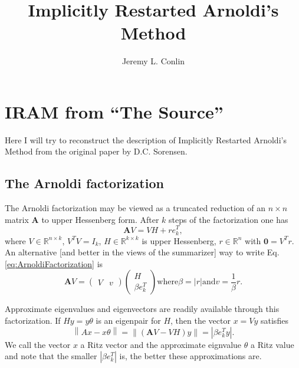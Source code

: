 \documentclass[12pt]{article}
\title{Implicitly Restarted Arnoldi's Method}
\author{Jeremy L. Conlin}
\newcommand{\A}{\mathbf{A}}
\begin{document}
\maketitle
\section{IRAM from ``The Source''}
Here I will try to reconstruct the description of Implicitly Restarted Arnoldi's Method from the original paper by D.C. Sorensen.

\subsection{The Arnoldi factorization}
The Arnoldi factorization may be viewed as a truncated reduction of an $n \times n$ matrix $\A$ to upper Hessenberg form.  After $k$ steps of the factorization one has
\begin{equation}
    \A V = VH + re_k^T,
    \label{eq:ArnoldiFactorization}
\end{equation}
where $V \in \mathbb{R}^{n \times k}$, $V^TV = I_k$, $H \in \mathbb{R}^{k \times k}$ is upper Hessenberg, $r \in \mathbb{R}^n$ with $\mathbf{0} = V^Tr$.  An alternative [and better in the views of the summarizer] way to write Eq. \ref{eq:ArnoldiFactorization} is
\begin{equation}
    \A V = \begin{pmatrix}V & v\end{pmatrix}\begin{pmatrix} H \\ \beta e_k^T \end{pmatrix} \mathrm{ where } \beta = \left| r \right| \mathrm{ and } v = \frac{1}{\beta}r.
    \label{}
\end{equation}

Approximate eigenvalues and eigenvectors are readily available through this factorization.  If $Hy = y\theta$ is an eigenpair for $H$, then the vector $x = Vy$ satisfies
\begin{equation}
    \left\|Ax-x\theta\right\| = \left\|\left(\A V - VH\right)y\right\| = \left|\beta e_k^Ty\right|.
    \label{}
\end{equation}
We call the vector $x$ a Ritz vector and the approximate eignvalue $\theta$ a Ritz value and note that the smaller $\left|\beta e_k^T\right|$ is, the better these approximations are.
\end{document}
